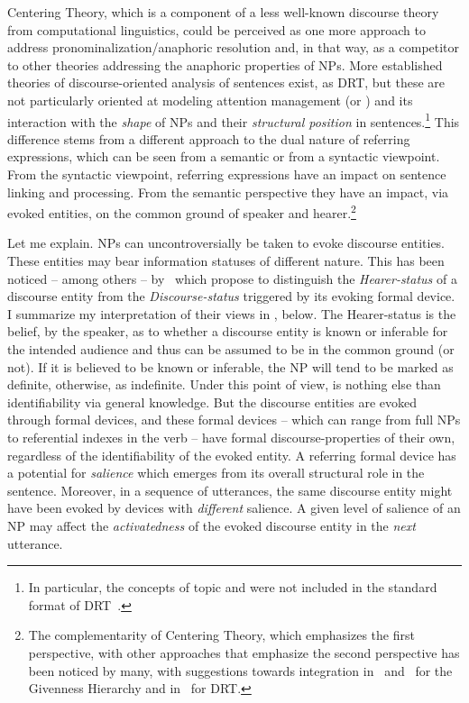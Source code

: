 \documentclass[output=paper
,modfonts
,nonflat]{langsci/langscibook}
\begin{document}
Centering Theory, which is a component of a less well-known discourse theory from computational linguistics, could be perceived as one more approach to address pronominalization/anaphoric resolution and, in that way, as a competitor to other theories addressing the anaphoric properties of NPs. More established theories of discourse-oriented analysis of sentences exist, as DRT, but these are not particularly oriented at modeling attention management (or ) and its interaction with the \textit{shape} of NPs and their \textit{structural position} in sentences.\footnote{In particular, the concepts of topic and  were not included in the standard format of DRT~\citep[see][360, 639]{KampReyle1993}.} This difference stems from a different approach to the dual nature of referring expressions, which can be seen from a semantic or from a syntactic viewpoint. From the syntactic viewpoint, referring expressions have an impact on sentence linking and processing. From the semantic perspective they have an impact, via evoked entities, on the common ground of speaker and hearer.\footnote{The complementarity of Centering Theory, which emphasizes the first perspective, with other approaches that emphasize the second perspective has been noticed by many, with suggestions towards integration in~\citet{WalkerPrince1996} and~\citet{Gundel1998} for the Givenness Hierarchy and in~\citet{Roberts1998place,Roberts2012} for DRT.} 

Let me explain. NPs can uncontroversially be taken to evoke discourse entities. These entities may bear information statuses of different nature. This has been noticed -- among others -- by~\citet[291--294]{WalkerPrince1996} which propose to distinguish the \textit{Hearer-status} of a discourse entity from the \textit{Discourse-status} triggered by its evoking formal device. I summarize my interpretation of their views in , below. The Hearer-status is the belief, by the speaker, as to whether a discourse entity is known or inferable for the intended audience and thus can be assumed to be in the common ground (or not). If it is believed to be known or inferable, the NP will tend to be marked as definite, otherwise, as indefinite. Under this point of view,  is nothing else than identifiability via general knowledge. But the discourse entities are evoked through formal devices, and these formal devices -- which can range from full NPs to referential indexes in the verb -- have formal discourse-properties of their own, regardless of the identifiability of the evoked entity. A referring formal device has a potential for \textit{salience} which emerges from its overall structural role in the sentence. Moreover, in a sequence of utterances, the same discourse entity might have been evoked by devices with \textit{different} salience. A given level of salience of an NP may affect the \textit{activatedness} of the evoked discourse entity in the \textit{next} utterance.
\end{document}
